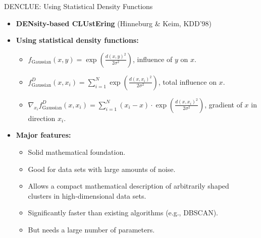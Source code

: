 \begin{frame}{DENCLUE: Using Statistical Density Functions}
	\begin{itemize}
		\item \textbf{DENsity-based CLUstEring} (Hinneburg \& Keim, KDD'98)
		\item \textbf{Using statistical density functions:}
		      \begin{itemize}
			      \item $f_{\text{Gaussian}}(x,y)=
				            \exp\left(\frac{d(x,y)^2}{2\sigma^2}\right)$, influence of $y$ on
			            $x$.
			      \item $f^D_{\text{Gaussian}}(x,x_i)= \sum_{i=1}^{N}
				            \exp\left(\frac{d(x,x_i)^2}{2\sigma^2}\right)$, total influence on
			            $x$.
			      \item $\nabla_{x_i} f^D_{\text{Gaussian}}(x,x_i) = \sum_{i=1}^{N}
				            (x_i-x) \cdot \exp\left(\frac{d(x,x_i)^2}{2\sigma^2}\right)$,
			            gradient of $x$ in direction $x_i$.
		      \end{itemize}
		\item \textbf{Major features:}
		      \begin{itemize}
			      \item Solid mathematical foundation.
			      \item Good for data sets with large amounts of noise.
			      \item Allows a compact mathematical description of arbitrarily
			            shaped \\
			            clusters in high-dimensional data sets.
			      \item Significantly faster than existing algorithms (e.g., DBSCAN).
			      \item But needs a large number of parameters.
		      \end{itemize}
	\end{itemize}
\end{frame}

